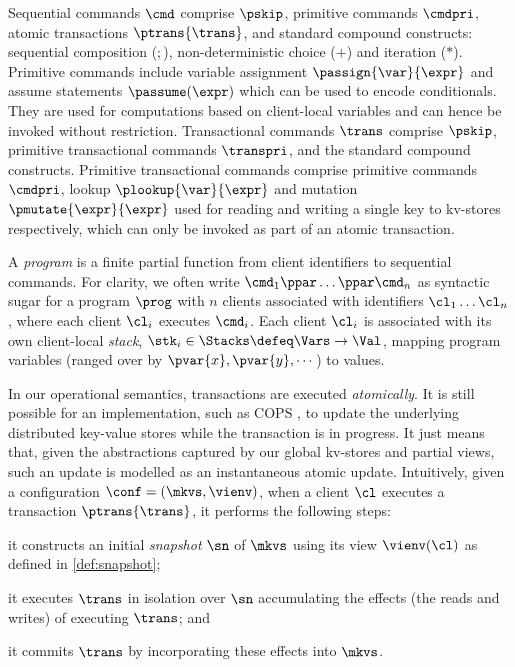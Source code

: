 \noindent
Sequential commands \(\cmd\) comprise \(\pskip\), primitive commands
\(\cmdpri\), atomic transactions \(\ptrans{\trans}\), and standard
compound constructs: sequential composition (\( ; \)), non-deterministic
choice (\( + \)) and iteration (\( * \)). 
Primitive commands include variable assignment
\(\passign{\var}{\expr}\) and assume statements \(\passume(\expr)\)
which can be used to encode conditionals. They are used for computations based on client-local variables and can hence be invoked
without restriction.  Transactional commands \(\trans\) comprise
\(\pskip\), primitive transactional commands \(\transpri\), and the
standard compound constructs.  Primitive transactional commands comprise
primitive commands \(\cmdpri\), lookup \(\plookup{\var}{\expr}\) and mutation
\(\pmutate{\expr}{\expr}\) used for reading and writing a single key to kv-stores
respectively, which can only be invoked as part of an atomic
transaction.


A {\em program} is a finite partial function from client identifiers to sequential
commands.
For clarity, we often write \( \cmd_{1}\ppar \dots \ppar \cmd_{n}\) as syntactic sugar 
for a program \( \prog \) with \(n\) clients associated with identifiers
\(\cl_1 \dots \cl_n\), where each client \(\cl_i\) executes
\(\cmd_i\). 
Each client \(\cl_i\) is associated with its own client-local \emph{stack}, 
\(\stk_i \in \Stacks \defeq \Vars \to \Val\),  mapping program variables
(ranged over by \(\pvar{x}, \pvar{y}, \cdots\))
to values. 

In our operational semantics, transactions are executed
\emph{atomically}. It is still possible for an
implementation, such as COPS \cite{cops}, 
to update the underlying distributed key-value stores while
the transaction is in progress. It just means that, given the
abstractions captured by our global kv-stores and partial views, 
such an update is modelled as  an instantaneous  atomic
update.
Intuitively, given a configuration \(\conf = (\mkvs, \vienv)\), 
when a client \(\cl\) executes a transaction \(\ptrans{\trans}\), 
it performs the following steps: 
\begin{enumerate*}
	\item it constructs an initial \emph{snapshot} \(\sn\) of \(\mkvs\) using its view \(\vienv(\cl)\) as defined in \cref{def:snapshot};  
	\item it executes \(\trans\) in isolation over \(\sn\)
        accumulating the effects (the reads and writes) of executing \(\trans\); and
	\item it commits \(\trans\) by incorporating these effects into \(\mkvs\).
\end{enumerate*}

